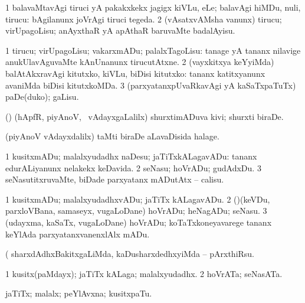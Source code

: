 \begin{center}
\bentry
{} 
\gl{\sakirx}
\expl{}
\bmng
\bnum
\num{1} balavaMtavAgi tiruci yA pakakxkekx jagigx kiVLu, eLe; balavAgi hiMDu, nuli, tirucu:  bAgilanunx joVrAgi tiruci tegeda. 
\num{2} (vAsatxvAMsha \mo vanunx) tirucu; virUpagoLisu; anAyxthaR yA apAthaR baruvaMte badalAyisu. 
\enum
\emng
\eentry

\bentry
{} 
\gl{\sakirx}
\expl{}
\bmng
\bnum
\num{1} tirucu; virUpagoLisu; vakarxmADu; palalxTagoLisu:  tanage yA tananx nilavige anukUlavAguvaMte kAnUnanunx tirucutAtxne. 
\num{2} (vayxkitxya keYyiMda) balAtAkxravAgi kitutxko, kiVLu, biDisi kitutxko:  tananx katitxyanunx avaniMda biDisi kitutxkoMDa. 
\num{3} (parxyatanxpUvaRkavAgi yA kaSaTxpaTuTx) paDe(duko); gaLisu. 
\enum
\emng
\eentry

\bentry
{} 
\gl{\nA}
\expl{}
\bmng
(\pArxparx) (hApfR, piyAnoV, \mo\ vAdayxgaLalilx) shurxtimADuva kivi; shurxti biraDe. 
\emng
\eentry

\bentry
{} 
\gl{\nA}
\expl{}
\bmng
(piyAnoV vAdayxdalilx) taMti biraDe aLavaDisida halage. 
\emng
\eentry

\bentry 
{} 
\gl{\sakirx}
\expl{}
\bmng
\bnum
\num{1} kusitxmADu; malalxyudadhx naDesu; jaTiTxkALagavADu:  tananx edurALiyanunx nelakekx keDavida. 
\num{2} seNasu; hoVrADu; gudAdxDu. 
\num{3} seNasutitxruvaMte, biDade parxyatanx mADutAtx -- calisu. 
\enum
\emng

\noindent
\gl{\akirx}
\expl{}
\bmng
\bnum
\num{1} kusitxmADu; malalxyudadhxvADu; jaTiTx kALagavADu. 
\num{2} (\rUpa)(keVDu, parxloVBana, samaseyx, \mo vugaLoDane) hoVrADu; heNagADu; seNasu. 
\num{3} (udayxma, kaSaTx, \mo vugaLoDane) hoVrADu; koTaTxkoneyavarege tananx keYlAda parxyatanxvanenxlAlx mADu. 
\enum
\emng

\noindent
\gl{\pagu}
\expl{}
\bmng
{} (  sharxdAdhxBakitxgaLiMda, kaDusharxdedhxyiMda -- pArxthiRsu. 
\emng
\eentry

\bentry 
{} 
\gl{\nA}
\expl{}
\bmng
\bnum
\num{1} kusitx(paMdayx); jaTiTx kALaga; malalxyudadhx. 
\num{2} hoVrATa; seNasATa. 
\enum
\emng
\eentry

\bentry
{} 
\gl{\nA}
\expl{}
\bmng
jaTiTx; malalx; peYlAvxna; kusitxpaTu. 
\emng
\eentry


\end{center}
